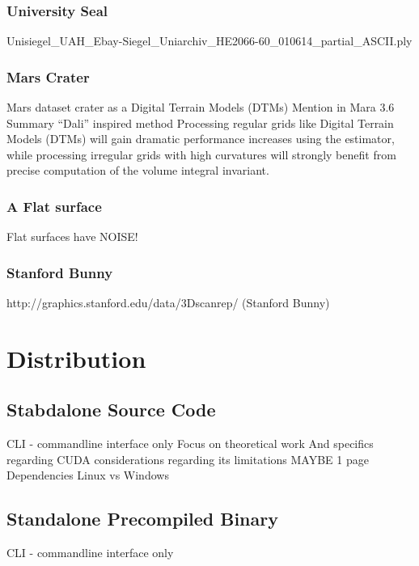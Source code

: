 \documentclass[openany]{book}
\begin{document}
\subsection{University Seal}
Unisiegel\_UAH\_Ebay-Siegel\_Uniarchiv\_HE2066-60\_010614\_partial\_ASCII.ply

\subsection{Mars Crater}
Mars dataset crater as a Digital Terrain Models (DTMs) Mention in Mara 3.6 Summary “Dali” inspired method
Processing regular grids like Digital Terrain Models (DTMs) will gain dramatic performance increases using the estimator, while processing irregular grids with high curvatures will strongly benefit from precise computation of the volume integral invariant.~\cite[p.~143]{Mara12}

\subsection{A Flat surface}
Flat surfaces have NOISE!

\subsection{Stanford Bunny}
http://graphics.stanford.edu/data/3Dscanrep/ (Stanford Bunny)



\chapter{Distribution}
\section{Stabdalone Source Code}
CLI - commandline interface only
Focus on theoretical work 
And specifics regarding CUDA considerations regarding its limitations
MAYBE 1 page
Dependencies
Linux vs Windows



\section{Standalone Precompiled Binary}
CLI - commandline interface only
\end{document}
